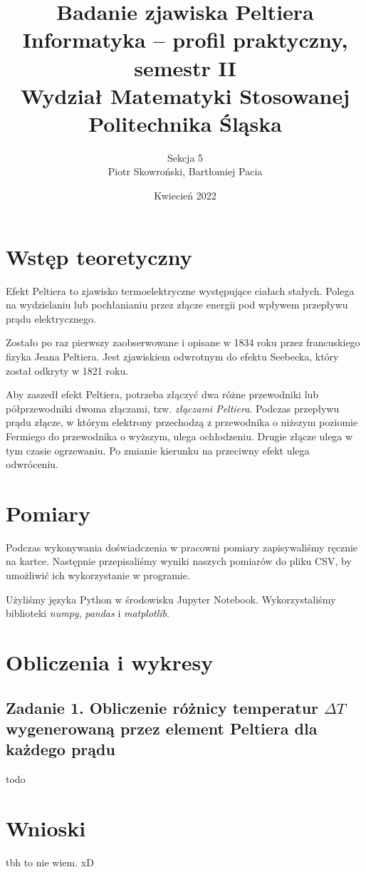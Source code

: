 \documentclass[12pt]{article}
\title{ Badanie zjawiska Peltiera \\
    \large Informatyka – profil praktyczny, semestr II \\
    Wydział Matematyki Stosowanej \\
    Politechnika Śląska \\}
\author{ Sekcja 5 \\
    Piotr Skowroński, Bartłomiej Pacia}
\date{Kwiecień 2022}
\begin{document}
\maketitle

\section{Wstęp teoretyczny}

Efekt Peltiera to zjawisko termoelektryczne występujące ciałach stałych. Polega
na wydzielaniu lub pochłanianiu przez złącze energii pod wpływem przepływu prądu
elektrycznego.

Zostało po raz pierwszy zaobserwowane i opisane w 1834 roku przez francuskiego
fizyka Jeana Peltiera. Jest zjawiskiem odwrotnym do efektu Seebecka, który
został odkryty w 1821 roku.

Aby zaszedł efekt Peltiera, potrzeba złączyć dwa różne przewodniki lub
półprzewodniki dwoma złączami, tzw. \textit{złączami Peltiera}. Podczas
przepływu prądu złącze, w którym elektrony przechodzą z przewodnika o niższym
poziomie Fermiego do przewodnika o wyższym, ulega ochłodzeniu. Drugie złącze
ulega w tym czasie ogrzewaniu. Po zmianie kierunku na przeciwny efekt ulega
odwróceniu.

\section{Pomiary}

Podczas wykonywania doświadczenia w pracowni pomiary zapisywaliśmy ręcznie na
kartce. Następnie przepisaliśmy wyniki naszych pomiarów do pliku CSV, by
umożliwić ich wykorzystanie w programie.

Użyliśmy języka Python w środowisku Jupyter Notebook. Wykorzystaliśmy biblioteki
\textit{numpy}, \textit{pandas} i \textit{matplotlib}.

\section{Obliczenia i wykresy}

\subsection*{Zadanie 1. Obliczenie różnicy temperatur $\Delta T$ wygenerowaną
    przez element Peltiera dla każdego prądu}

todo

\section{Wnioski}

tbh to nie wiem. xD
\end{document}
